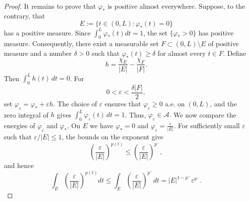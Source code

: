 \documentclass[12pt]{amsart}
\numberwithin{equation}{section}
\theoremstyle{plain}
\theoremstyle{definition}
\begin{document}
\begin{proof}
It remains to prove that $\varphi_*$ is positive almost everywhere.
Suppose, to the contrary, that
\begin{equation*}
E:=\{t\in(0,L):\varphi_*(t)=0\}
\end{equation*}
has a positive measure. Since
$\int_0^L\varphi_*(t)dt=1$,
the set $\{\varphi_*>0\}$ has positive measure. Consequently, there
exist a measurable set
$F\subset (0,L)\setminus E$
of positive measure and a number $\delta>0$ such that $\varphi_*(t)\ge\delta$ for almost every $t\in F$.
Define
\begin{equation*}
h
=
\frac{\chi_E}{|E|}
-
\frac{\chi_F}{|F|}.
\end{equation*}
Then
$\int_0^L h(t)\,dt=0$.
For
\begin{equation*}
0<\varepsilon<\frac{\delta|F|}{2},
\end{equation*}
set
$\varphi_\varepsilon
=
\varphi_*+\varepsilon h$.
The choice of $\varepsilon$ ensures that $\varphi_\varepsilon\ge0$ a.e. on $(0,L)$,
and the zero integral of $h$ gives
$\int_0^L\varphi_\varepsilon(t)\,dt=1$.
Thus,
$\varphi_\varepsilon\in\mathcal A.$ We now compare the energies of $\varphi_\varepsilon$ and $\varphi_*$. On
$E$ we have $\varphi_*=0$ and
$\varphi_\varepsilon=\frac{\varepsilon}{|E|}$.
For sufficiently small $\varepsilon$ such that
$\varepsilon/|E|\le1$, the bounds on the exponent give
\begin{equation*}
\left(\frac{\varepsilon}{|E|}\right)^{p(t)}
\le
\left(\frac{\varepsilon}{|E|}\right)^{p^-},
\end{equation*}
and hence
\begin{equation*}
\int_E
\left(\frac{\varepsilon}{|E|}\right)^{p(t)}dt
\le \int_E \left(\frac{\varepsilon}{|E|}\right)^{p^-}dt=
|E|^{1-p^-}\varepsilon^{p^-}.
\end{equation*}


\end{proof}
\end{document}
